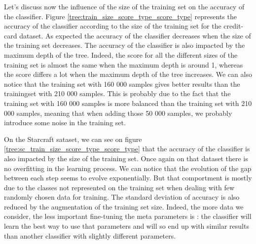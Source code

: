 \documentclass[twocolumn, a4paper, 10pt]{article}
\begin{document}
		Let's discuss now the influence of the size of the training set on the accuracy of the classifier. Figure \ref{tree:train_size_score_type_score_type} represents the accuracy of the classifier according to the size of the training set for the credit-card dataset. As expected the accuracy of the classifier decreases when the size of the training set decreases. The accuracy of the classifier is also impacted by the maximum depth of the tree. Indeed, the score for all the different sizes of the training set is almost the same when the maximum depth is around 1, whereas the score differs a lot when the maximum depth of the tree increases. We can also notice that the training set with 160 000 samples gives better results than the trainingset with 210 000 samples. This is probably due to the fact that the training set with 160 000 samples is more balanced than the training set with 210 000 samples, meaning that when adding those 50 000 samples, we probably introduce some noise in the training set.

		On the Starcraft sataset, we can see on figure \ref{tree:sc_train_size_score_type_score_type} that the accuracy of the classifier is also impacted by the size of the training set. Once again on that dataset there is no overfitting in the learning process. We can notice that the evolution of the gap between each step seems to evolve exponentially. But that comportment is mostly due to the classes not represented on the training set when dealing with few randomly chosen data for training. The standard deviation of accuracy is also reduced by the augmentation of the training set size. Indeed, the more data we consider, the less important fine-tuning the meta parameters is : the classifier will learn the best way to use that parameters and will so end up with similar results than another classifier with slightly different parameters.
\end{document}
